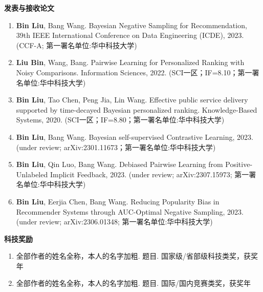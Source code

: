 \begin{publications}
\noindent
\textbf{发表与接收论文}
\renewcommand{\labelenumi}{[\arabic{enumi}]}
\begin{enumerate}
\item \textbf{Bin Liu}, Bang Wang. Bayesian Negative Sampling for Recommendation, 39th IEEE International Conference on Data Engineering (ICDE), 2023. (CCF-A; 第一署名单位:华中科技大学)
\item \textbf{Liu Bin}, Wang, Bang. Pairwise Learning for Personalized Ranking with Noisy Comparisons. Information Sciences, 2022. (SCI一区；IF=8.10；第一署名单位:华中科技大学)
\item \textbf{Bin Liu}, Tao Chen, Peng Jia, Lin Wang. Effective public service delivery supported by time-decayed Bayesian personalized ranking. Knowledge-Based Systems, 2020. (SCI一区；IF=8.80；第一署名单位:华中科技大学)
\item \textbf{Bin Liu}, Bang Wang. Bayesian self-supervised Contrastive Learning, 2023. (under review; arXiv:2301.11673；第一署名单位:华中科技大学)
\item \textbf{Bin Liu}, Qin Luo, Bang Wang. Debiased Pairwise Learning from Positive-Unlabeled Implicit Feedback, 2023. (under review; arXiv:2307.15973; 第一署名单位:华中科技大学)
\item \textbf{Bin Liu}, Eerjia Chen, Bang Wang. Reducing Popularity Bias in Recommender Systems through AUC-Optimal Negative Sampling, 2023. (under review; arXiv:2306.01348; 第一署名单位:华中科技大学)




\end{enumerate}
\textbf{科技奖励}
\renewcommand{\labelenumi}{[\arabic{enumi}]}
\begin{enumerate}
\item 全部作者的姓名全称，本人的名字加粗. 题目. 国家级/省部级科技类奖，获奖年
\item 全部作者的姓名全称，本人的名字加粗. 题目. 国际/国内竞赛类奖，获奖年
\end{enumerate}
\end{publications}

